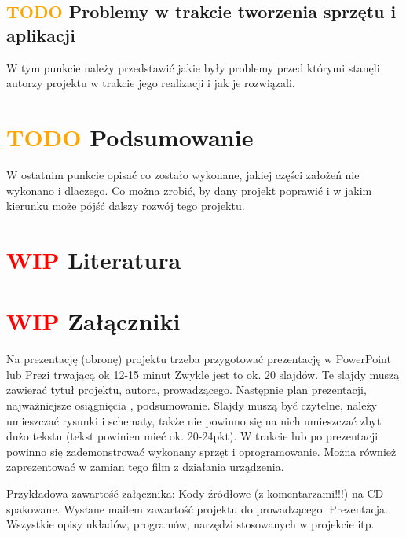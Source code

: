 \documentclass[11pt,titlepage,a4paper]{article}
\begin{document}
\subsection{\textcolor{orange}{TODO} Problemy w trakcie tworzenia sprzętu i aplikacji}

W tym punkcie należy przedstawić jakie były problemy przed którymi stanęli autorzy projektu w trakcie jego realizacji i jak je rozwiązali.

\newpage

\section{\textcolor{orange}{TODO} Podsumowanie}

W ostatnim punkcie opisać co zostało wykonane, jakiej części założeń nie wykonano i dlaczego. Co można zrobić, by dany projekt poprawić i w jakim kierunku może pójść dalszy rozwój tego projektu.

\newpage

\section{\textcolor{red}{WIP}  Literatura}

\printbibliography[heading=none]

\newpage

\section{\textcolor{red}{WIP} Załączniki}

Na prezentację (obronę) projektu trzeba przygotować prezentację w PowerPoint lub Prezi trwającą ok 12-15 minut Zwykle jest to ok. 20 slajdów. Te slajdy muszą zawierać tytuł projektu, autora, prowadzącego. Następnie plan prezentacji, najważniejsze osiągnięcia , podsumowanie. Slajdy muszą być czytelne, należy umieszczać rysunki i schematy, także nie powinno się na nich umieszczać zbyt dużo tekstu (tekst powinien mieć ok. 20-24pkt). W trakcie lub po prezentacji powinno się zademonstrować wykonany sprzęt i oprogramowanie. Można również zaprezentować w zamian tego film z działania urządzenia.

Przykładowa zawartość załącznika:
Kody źródłowe (z komentarzami!!!) na CD spakowane.
Wysłane mailem zawartość projektu do prowadzącego.
Prezentacja.
Wszystkie opisy układów, programów, narzędzi stosowanych w projekcie itp.

\newpage
\end{document}
